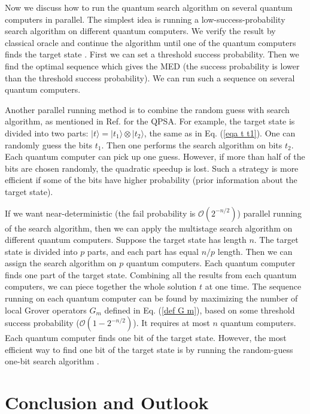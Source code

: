 \documentclass[%
 twocolumn,
 10pt,
 superscriptaddress,
 longbibliography,
 amsmath,amssymb,
 aps,
 pra,
floatfix,
]{revtex4-1}
\begin{document}
Now we discuss how to run the quantum search algorithm on several quantum computers in parallel. The simplest idea is running a low-success-probability search algorithm on different quantum computers. We verify the result by classical oracle and continue the algorithm until one of the quantum computers finds the target state \cite{GWC00}. First we can set a threshold success probability. Then we find the optimal sequence which gives the MED (the success probability is lower than the threshold success probability). We can run such a sequence on several quantum computers. 

Another parallel running method is to combine the random guess with search algorithm, as mentioned in Ref. \cite{Korepin05} for the QPSA. For example, the target state is divided into two parts: $|t\rangle=|t_1\rangle\otimes|t_2\rangle$, the same as in Eq. (\ref{eqa t t1}). One can randomly guess the bits $t_1$. Then one performs the search algorithm on bits $t_2$. Each quantum computer can pick up one guess. However, if more than half of the bits are chosen randomly, the quadratic speedup is lost. Such a strategy is more efficient if some of the bits have higher probability (prior information about the target state). 
    	
If we want near-deterministic (the fail probability is $\mathcal O(2^{-n/2})$) parallel running of the search algorithm, then we can apply the multistage search algorithm on different quantum computers. Suppose the target state has length $n$. The target state is divided into $p$ parts, and each part has equal $n/p$ length. Then we can assign the search algorithm on $p$ quantum computers. Each quantum computer finds one part of the target state. Combining all the results from each quantum computers, we can piece together the whole solution $t$ at one time. The sequence running on each quantum computer can be found by maximizing the number of local Grover operators $G_m$ defined in Eq. (\ref{def G m}), based on some threshold success probability ($\mathcal O(1-2^{-n/2})$). It requires at most $n$ quantum computers. Each quantum computer finds one bit of the target state. However, the most efficient way to find one bit of the target state is by running the random-guess one-bit search algorithm \cite{Korepin05}. 

\section{\label{sec:conclusion}Conclusion and Outlook}
\end{document}
